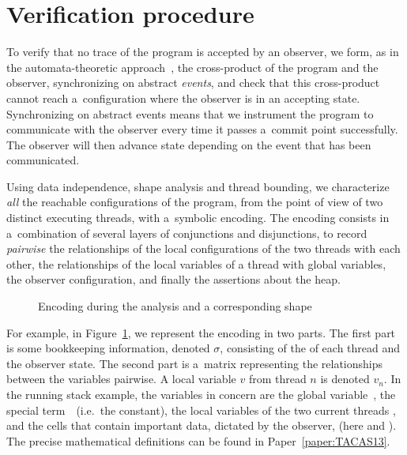 \section{Verification procedure}
\label{section:shape:verification:procedure}

To verify that no trace of the program is accepted by an observer, we
form, as in the automata-theoretic approach~\cite{VW:modelchecking},
the cross-product of the program and the observer, synchronizing on
abstract \emph{events}, and check that this cross-product cannot reach
a~configuration where the observer is in an accepting state.
%
Synchronizing on abstract events means that we instrument the program
to communicate with the observer every time it passes a~commit point
successfully. The observer will then advance state depending on the
event that has been communicated.

Using data independence, shape analysis and thread bounding, we
characterize \emph{all} the reachable configurations of the program,
from the point of view of two distinct executing threads, with
a~symbolic encoding.
%
%
The encoding consists in a~combination of several layers of
conjunctions and disjunctions, to record \emph{pairwise} the
relationships of the local configurations of the two threads with each
other, the relationships of the local variables of a thread with
global variables, the observer configuration, and finally the
assertions about the heap.

\begingroup%
\setlength\intextsep{\dazintextsep}
\begin{figure}[ht]
  \caption{Encoding during the analysis and a corresponding shape}
  \label{figure:shape:encoding}
\end{figure}
\endgroup

%
For example, in Figure~\ref{figure:shape:encoding}, we represent the
encoding in two parts. The first part is some bookkeeping information,
denoted $\sigma$, consisting of the  of each thread and
the observer state.
%
The second part is a~matrix representing the relationships between the
variables pairwise.
%
A local variable $v$ from thread $n$ is denoted $v_n$.
%
In the running stack example, the variables in concern are the global
variable~, the special term~\nullconst\ (i.e.\ the
 constant), the local variables of the two current
threads , %
and the cells that contain important data, dictated by the observer,
(here  and ).
%
The precise mathematical definitions can be found in
Paper~\ref{paper:TACAS13}.

